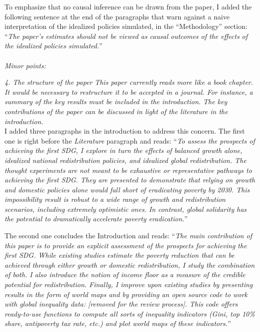 \documentclass[12pt,english]{article}
\begin{document}
To emphasize that no causal inference can be drawn from the paper, I added the following sentence at the end of the paragraphs that warn against a naive interpretation of the idealized policies simulated, in the ``Methodology'' section: ``\textit{The paper's estimates should not be viewed as causal outcomes of the effects of the idealized policies simulated.}''
~\\ ~\\

\textit{Minor points:}
 
\textit{4.	The structure of the paper}
\textit{This paper currently reads more like a book chapter. It would be necessary to restructure it to be accepted in a journal. For instance, a summary of the key results must be included in the introduction. The key contributions of the paper can be discussed in light of the literature in the introduction.}~\\

I added three paragraphs in the introduction to address this concern. The first one is right before the \textit{Literature} paragraph and reads: ``\textit{To assess the prospects of achieving the first SDG, I explore in turn the effects of balanced growth alone, idealized national redistribution policies, and idealized global redistribution. The thought experiments are not meant to be exhaustive or representative pathways to achieving the first SDG. They are presented to demonstrate that relying on growth and domestic policies alone would fall short of eradicating poverty by 2030. This impossibility result is robust to a wide range of growth and redistribution scenarios, including extremely optimistic ones. In contrast, global solidarity has the potential to dramatically accelerate poverty eradication.}''

The second one concludes the Introduction and reads: ``\textit{The main contribution of this paper is to provide an explicit assessment of the prospects for achieving the first SDG. While existing studies estimate the poverty reduction that can be achieved through either growth or domestic redistribution, I study the combination of both. I also introduce the notion of \textit{income floor} as a measure of the credible potential for redistribution. Finally, I improve upon existing studies by presenting results in the form of world maps and by providing an open source code to work with global inequality data: [\textit{removed for the review process}]. This code offers ready-to-use functions to compute all sorts of inequality indicators (Gini, top 10\% share, antipoverty tax rate, etc.) and plot world maps of these indicators.}''
\end{document}
